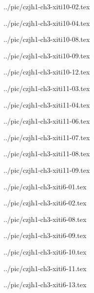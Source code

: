 ../pic/czjh1-ch3-xiti10-02.tex



../pic/czjh1-ch3-xiti10-04.tex



../pic/czjh1-ch3-xiti10-08.tex



../pic/czjh1-ch3-xiti10-09.tex



../pic/czjh1-ch3-xiti10-12.tex



../pic/czjh1-ch3-xiti11-03.tex



../pic/czjh1-ch3-xiti11-04.tex



../pic/czjh1-ch3-xiti11-06.tex



../pic/czjh1-ch3-xiti11-07.tex



../pic/czjh1-ch3-xiti11-08.tex



../pic/czjh1-ch3-xiti11-09.tex



../pic/czjh1-ch3-xiti6-01.tex



../pic/czjh1-ch3-xiti6-02.tex



../pic/czjh1-ch3-xiti6-08.tex



../pic/czjh1-ch3-xiti6-09.tex



../pic/czjh1-ch3-xiti6-10.tex



../pic/czjh1-ch3-xiti6-11.tex



../pic/czjh1-ch3-xiti6-13.tex

